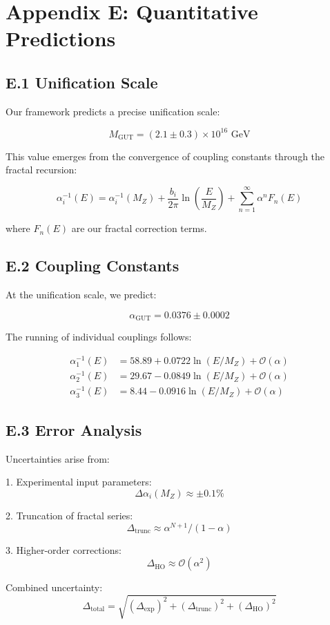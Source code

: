 \section*{Appendix E: Quantitative Predictions}
\label{app:predictions}

\subsection*{E.1 Unification Scale}
\label{subsec:unification_scale}

Our framework predicts a precise unification scale:

\[
M_{\text{GUT}} = (2.1 \pm 0.3) \times 10^{16} \text{ GeV}
\]

This value emerges from the convergence of coupling constants through the fractal recursion:

\[
\alpha_i^{-1}(E) = \alpha_i^{-1}(M_Z) + \frac{b_i}{2\pi}\ln\left(\frac{E}{M_Z}\right) + \sum_{n=1}^{\infty} \alpha^n F_n(E)
\]

where $F_n(E)$ are our fractal correction terms.

\subsection*{E.2 Coupling Constants}
\label{subsec:coupling_constants}

At the unification scale, we predict:

\[
\alpha_{\text{GUT}} = 0.0376 \pm 0.0002
\]

The running of individual couplings follows:

\begin{align*}
\alpha_1^{-1}(E) &= 58.89 + 0.0722\ln(E/M_Z) + \mathcal{O}(\alpha) \\
\alpha_2^{-1}(E) &= 29.67 - 0.0849\ln(E/M_Z) + \mathcal{O}(\alpha) \\
\alpha_3^{-1}(E) &= 8.44 - 0.0916\ln(E/M_Z) + \mathcal{O}(\alpha)
\end{align*}

\subsection*{E.3 Error Analysis}
\label{subsec:error_analysis}

Uncertainties arise from:

1. Experimental input parameters:
   \[
   \Delta\alpha_i(M_Z) \approx \pm 0.1\%
   \]

2. Truncation of fractal series:
   \[
   \Delta_{\text{trunc}} \approx \alpha^{N+1}/(1-\alpha)
   \]

3. Higher-order corrections:
   \[
   \Delta_{\text{HO}} \approx \mathcal{O}(\alpha^2)
   \]

Combined uncertainty:
\[
\Delta_{\text{total}} = \sqrt{(\Delta_{\text{exp}})^2 + (\Delta_{\text{trunc}})^2 + (\Delta_{\text{HO}})^2}
\] 